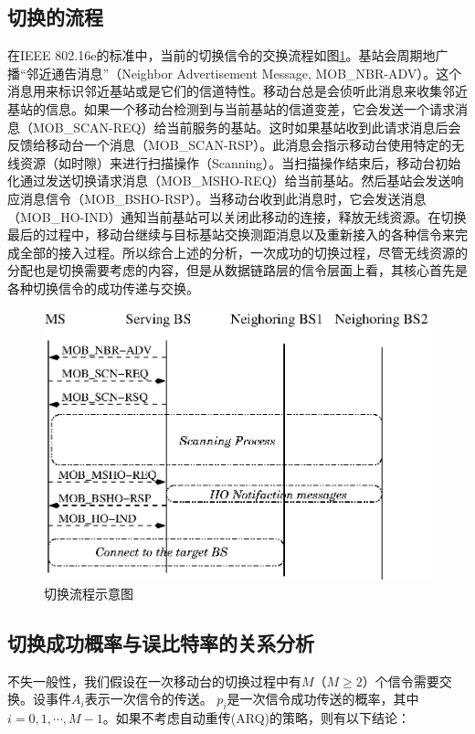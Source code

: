 \subsection{切换的流程}
\label{subsection_iccs_handover_algorithm_mobility_analysis_handover_flow}
在IEEE 802.16e的标准中，当前的切换信令的交换流程如图\ref{fig:chap_iccs_handover_algorithm_handover_flow}。基站会周期地广播“邻近通告消息”（Neighbor Advertisement Message, MOB\_NBR-ADV）。这个消息用来标识邻近基站或是它们的信道特性。移动台总是会侦听此消息来收集邻近基站的信息。如果一个移动台检测到与当前基站的信道变差，它会发送一个请求消息（MOB\_SCAN-REQ）给当前服务的基站。这时如果基站收到此请求消息后会反馈给移动台一个消息（MOB\_SCAN-RSP）。此消息会指示移动台使用特定的无线资源（如时隙）来进行扫描操作（Scanning）。当扫描操作结束后，移动台初始化通过发送切换请求消息（MOB\_MSHO-REQ）给当前基站。然后基站会发送响应消息信令（MOB\_BSHO-RSP）。当移动台收到此消息时，它会发送消息（MOB\_HO-IND）通知当前基站可以关闭此移动的连接，释放无线资源。在切换最后的过程中，移动台继续与目标基站交换测距消息以及重新接入的各种信令来完成全部的接入过程。所以综合上述的分析，一次成功的切换过程，尽管无线资源的分配也是切换需要考虑的内容，但是从数据链路层的信令层面上看，其核心首先是各种切换信令的成功传递与交换。
\begin{figure}[htbp]
\centering
\includegraphics[]{iccs_handover}
\caption{切换流程示意图}
\label{fig:chap_iccs_handover_algorithm_handover_flow}
\end{figure}

\subsection{切换成功概率与误比特率的关系分析}
不失一般性，我们假设在一次移动台的切换过程中有$M$（$M \ge 2 $）个信令需要交换。设事件$A_i$表示一次信令的传送。 $p_i$是一次信令成功传送的概率，其中 $i = 0,1, \cdots, M-1 $。如果不考虑自动重传(ARQ)的策略，则有以下结论：

